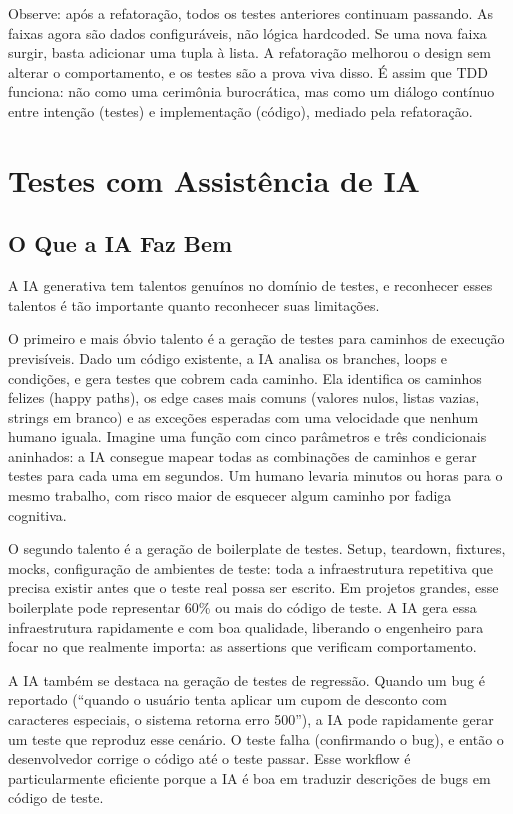 Observe: após a refatoração, todos os testes anteriores continuam passando. As
faixas agora são dados configuráveis, não lógica hardcoded. Se uma nova faixa
surgir, basta adicionar uma tupla à lista. A refatoração melhorou o design sem
alterar o comportamento, e os testes são a prova viva disso. É assim que TDD
funciona: não como uma cerimônia burocrática, mas como um diálogo
contínuo entre intenção (testes) e implementação (código), mediado pela
refatoração.

\section{Testes com Assistência de IA}

\subsection{O Que a IA Faz Bem}

A IA generativa tem talentos genuínos no domínio de testes, e reconhecer esses
talentos é tão importante quanto reconhecer suas limitações.

O primeiro e mais óbvio talento é a geração de testes para caminhos de execução
previsíveis. Dado um código existente, a IA analisa os branches, loops e
condições, e gera testes que cobrem cada caminho. Ela identifica os caminhos
felizes (happy paths), os edge cases mais comuns (valores nulos, listas vazias,
strings em branco) e as exceções esperadas com uma velocidade que nenhum humano
iguala. Imagine uma função com cinco parâmetros e três condicionais aninhados:
a IA consegue mapear todas as combinações de caminhos e gerar testes para cada
uma em segundos. Um humano levaria minutos ou horas para o mesmo trabalho, com
risco maior de esquecer algum caminho por fadiga cognitiva.

O segundo talento é a geração de boilerplate de testes. Setup, teardown,
fixtures, mocks, configuração de ambientes de teste: toda a infraestrutura
repetitiva que precisa existir antes que o teste real possa ser escrito. Em
projetos grandes, esse boilerplate pode representar 60\% ou mais do código de
teste. A IA gera essa infraestrutura rapidamente e com boa qualidade, liberando
o engenheiro para focar no que realmente importa: as assertions que verificam
comportamento.

A IA também se destaca na geração de testes de regressão. Quando um bug é
reportado (``quando o usuário tenta aplicar um cupom de desconto com
caracteres especiais, o sistema retorna erro 500''), a IA pode rapidamente
gerar um teste que reproduz esse cenário. O teste falha (confirmando
o bug), e então o desenvolvedor corrige o código até o teste passar. Esse
workflow é particularmente eficiente porque a IA é boa em traduzir descrições
de bugs em código de teste.


